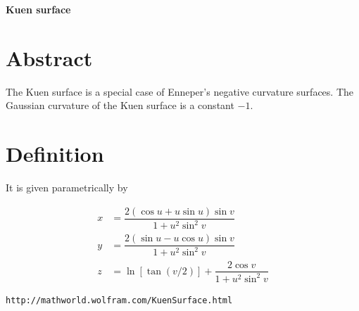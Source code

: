 \documentclass[12pt,dvipdfmx]{article}
\begin{document}
\begin{center}

{\bf \Large Kuen surface}

\end{center}


\section{Abstract}
The Kuen surface is a special case of Enneper's negative curvature surfaces.  The Gaussian curvature of the Kuen surface is a constant $-1$.

\section{Definition}

It is given parametrically by

\begin{align*}
x	&=	\dfrac{2(\cos u+u\sin u)\sin v}{1+u^2\sin^2v} \\	
y	&=	\dfrac{2(\sin u-u\cos u)\sin v}{1+u^2\sin^2v} \\
z	&=\ln[\tan(v/2)]+\dfrac{2\cos v}{1+u^2\sin^2v}
\end{align*}

\begin{thebibliography}{9}

 \verb|http://mathworld.wolfram.com/KuenSurface.html|


\end{thebibliography}
\end{document}
